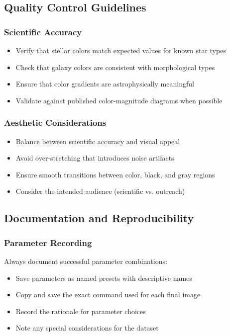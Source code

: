 \documentclass[11pt,a4paper]{article}
\begin{document}
\subsection{Quality Control Guidelines}

\subsubsection{Scientific Accuracy}

\begin{itemize}[leftmargin=*]
\item Verify that stellar colors match expected values for known star types
\item Check that galaxy colors are consistent with morphological types
\item Ensure that color gradients are astrophysically meaningful
\item Validate against published color-magnitude diagrams when possible
\end{itemize}

\subsubsection{Aesthetic Considerations}

\begin{itemize}[leftmargin=*]
\item Balance between scientific accuracy and visual appeal
\item Avoid over-stretching that introduces noise artifacts
\item Ensure smooth transitions between color, black, and gray regions
\item Consider the intended audience (scientific vs. outreach)
\end{itemize}

\subsection{Documentation and Reproducibility}

\subsubsection{Parameter Recording}

Always document successful parameter combinations:

\begin{itemize}[leftmargin=*]
\item Save parameters as named presets with descriptive names
\item Copy and save the exact command used for each final image
\item Record the rationale for parameter choices
\item Note any special considerations for the dataset
\end{itemize}
\end{document}
